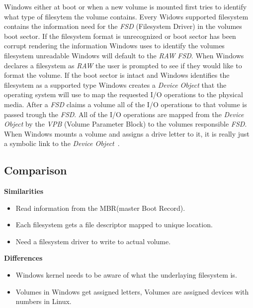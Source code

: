 \documentclass[letterpaper,10pt,notitlepage,fleqn]{article}
\begin{document}
Windows either at boot or when a new volume is mounted first tries to identify what 
type of filesytem the volume contains. Every Widows supported filesystem contains 
the information need for the \textit{FSD} (Filesystem Driver) in the volumes boot sector.
If the filesystem format is unrecognized or 
boot sector has been corrupt rendering the information Windows uses to identify the 
volumes filesystem unreadable Windows will default to the \textit{RAW} \textit{FSD}. When Windows 
declares a filesystem as \textit{RAW} the user is prompted to see if they would 
like to format the volume. If the boot sector is intact and Windows identifies the 
filesystem as a supported type Windows creates a \textit{Device Object} that the 
operating system will use to map the requested I/O operations to the physical 
media. After a \textit{FSD} claims a volume all of the I/O operations to that volume is 
passed trough the \textit{FSD}. All of the I/O operations are mapped from the \textit{Device Object} 
by the \textit{VPB} (Volume Parameter Block) to the volumes responsible \textit{FSD}.
When Windows mounts a volume and assigns a drive letter to it, it is really just 
a symbolic link to the \textit{Device Object}~\cite{WI26}.

\subsection*{Comparison}

\noindent \textbf{Similarities}\\
\begin{itemize}
    \item Read information from the MBR(master Boot Record).
    \item Each filesystem gets a file descriptor mapped to unique location.
    \item Need a filesystem driver to write to actual volume.
\end{itemize}
\noindent \textbf{Differences}\\
\begin{itemize}
    \item Windows kernel needs to be aware of what the underlaying filesystem is.
    \item Volumes in Windows get assigned letters, Volumes are assigned devices 
    with numbers in Linux.
\end{itemize}



\end{document}
